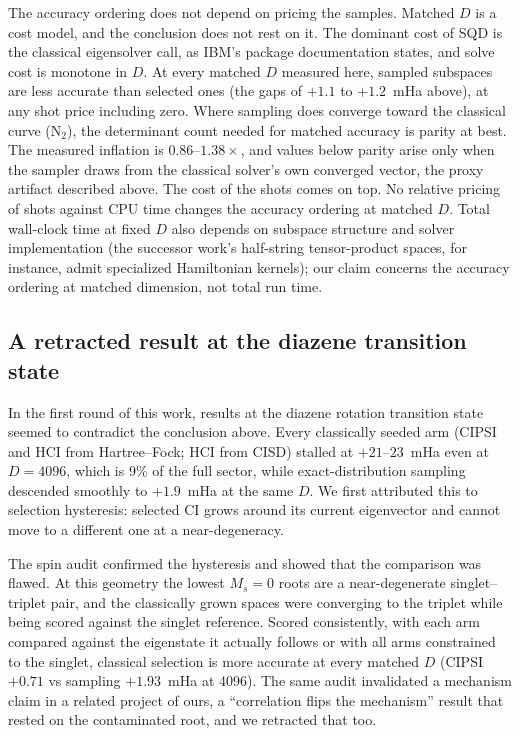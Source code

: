 \documentclass[11pt]{article}
\begin{document}
The accuracy ordering does not depend on pricing the samples. Matched $D$ is a cost model, and the conclusion does not rest on it. The dominant cost of SQD is the classical eigensolver call, as IBM's package documentation states, and solve cost is monotone in $D$. At every matched $D$ measured here, sampled subspaces are less accurate than selected ones (the gaps of $+1.1$ to $+1.2$~mHa above), at any shot price including zero. Where sampling does converge toward the classical curve (N$_2$), the determinant count needed for matched accuracy is parity at best. The measured inflation is $0.86$--$1.38\times$, and values below parity arise only when the sampler draws from the classical solver's own converged vector, the proxy artifact described above. The cost of the shots comes on top. No relative pricing of shots against CPU time changes the accuracy ordering at matched $D$. Total wall-clock time at fixed $D$ also depends on subspace structure and solver implementation (the successor work's half-string tensor-product spaces, for instance, admit specialized Hamiltonian kernels); our claim concerns the accuracy ordering at matched dimension, not total run time.

\subsection{A retracted result at the diazene transition state}\label{sec:retraction}

In the first round of this work, results at the diazene rotation transition state seemed to contradict the conclusion above. Every classically seeded arm (CIPSI and HCI from Hartree--Fock; HCI from CISD) stalled at $+21$--$23$~mHa even at $D=4096$, which is 9\% of the full sector, while exact-distribution sampling descended smoothly to $+1.9$~mHa at the same $D$. We first attributed this to selection hysteresis: selected CI grows around its current eigenvector and cannot move to a different one at a near-degeneracy.

The spin audit confirmed the hysteresis and showed that the comparison was flawed. At this geometry the lowest $M_s=0$ roots are a near-degenerate singlet--triplet pair, and the classically grown spaces were converging to the triplet while being scored against the singlet reference. Scored consistently, with each arm compared against the eigenstate it actually follows or with all arms constrained to the singlet, classical selection is more accurate at every matched $D$ (CIPSI $+0.71$ vs sampling $+1.93$~mHa at 4096). The same audit invalidated a mechanism claim in a related project of ours, a ``correlation flips the mechanism'' result that rested on the contaminated root, and we retracted that too.
\end{document}

